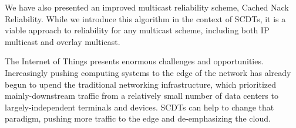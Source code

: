 We have also presented an improved multicast reliability scheme, Cached Nack Reliability. While we introduce this algorithm in the context of SCDTs, it is a viable approach to reliability for any multicast scheme, including both IP multicast and overlay multicast. 

The Internet of Things presents enormous challenges and opportunities. Increasingly pushing computing systems to the edge of the network has already begun to upend the traditional networking infrastructure, which prioritized mainly-downstream traffic from a relatively small number of data centers to largely-independent terminals and devices. SCDTs can help to change that paradigm, pushing more traffic to the edge and de-emphasizing the cloud.
